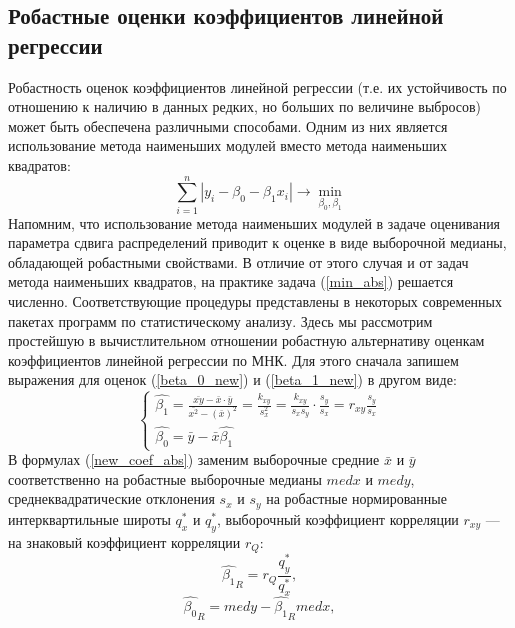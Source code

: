 \documentclass[a4paper]{article}
\begin{document}
    \subsection{Робастные оценки коэффициентов линейной регрессии}
    \noindent Робастность оценок коэффициентов линейной регрессии (т.е. их устойчивость по отношению к наличию в данных редких, но больших по величине выбросов) может быть обеспечена различными способами. Одним из них является использование метода наименьших модулей вместо метода наименьших квадратов:
    \begin{equation}
	    \sum_{i=1}^{n}{|y_{i} - \beta_{0} - \beta_{1}x_{i}|}\rightarrow \min_{\beta_{0}, \beta_{1}}
	    \label{min_abs}
	\end{equation}
    Напомним, что использование метода наименьших модулей в задаче оценивания параметра сдвига распределений приводит к оценке в виде выборочной медианы, обладающей робастными свойствами. В отличие от этого случая и от задач метода наименьших квадратов, на практике задача (\ref{min_abs}) решается численно. Соответствующие процедуры представлены в некоторых современных пакетах программ по статистическому анализу.
    \newline
    Здесь мы рассмотрим простейшую в вычистлительном отношении робастную альтернативу оценкам коэффициентов линейной регрессии по МНК. Для этого сначала запишем выражения для оценок (\ref{beta_0_new}) и (\ref{beta_1_new}) в другом виде:
    \begin{equation}
    	\begin{cases}
        \hat{\beta_{1}} = \frac{\bar{xy} - \bar{x} \cdot \bar{y}}{\bar{x^{2}} - (\bar{x})^{2}} = \frac{k_{xy}}{s_{x}^{2}} = \frac{k_{xy}}{s_{x}s_{y}} \cdot \frac{s_{y}}{s_{x}} = r_{xy}\frac{s_{y}}{s_{x}} \\         
        \hat{\beta_{0}} = \bar{y} - \bar{x}\hat{\beta_{1}}
        \end{cases}
        \label{new_coef_abs}
    \end{equation}
    В формулах (\ref{new_coef_abs}) заменим выборочные средние $\bar{x}$ и $\bar{y}$ соответственно на робастные выборочные медианы $med x$ и $med y$, среднеквадратические отклонения $s_{x}$ и $s_{y}$ на робастные нормированные интерквартильные широты $q^{*}_{x}$ и $q^{*}_{y}$, выборочный коэффициент корреляции $r_{xy}$ — на знаковый коэффициент корреляции $r_{Q}$: 
    $$
        \hat{\beta_{1}}_{R} = r_{Q}\frac{q^{*}_{y}}{q^{*}_{x}},
        \label{b_1R}
    $$
    $$
        \hat{\beta_{0}}_{R} = med y - \hat{\beta_{1}}_{R} med x,
        \label{b_0R}
    $$
\end{document}
